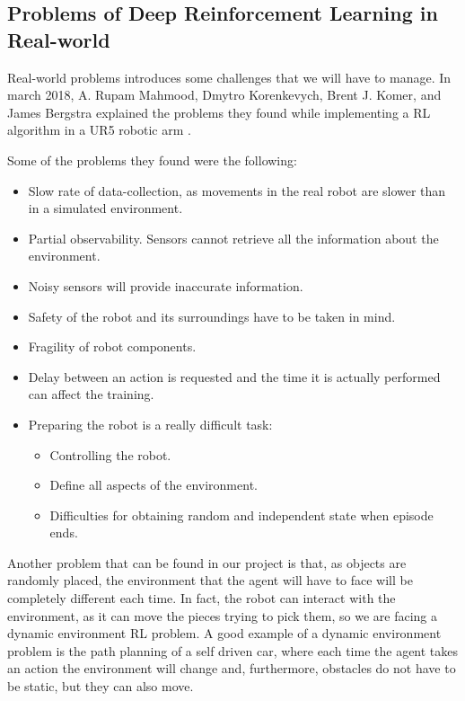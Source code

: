 		
		
		
		
		
	\subsection{Problems of Deep Reinforcement Learning in Real-world}
		
		Real-world problems introduces some challenges that we will have to manage. In march 2018, A. Rupam Mahmood, Dmytro Korenkevych, Brent J. Komer, and James Bergstra explained the problems they found while implementing a RL algorithm in a UR5 robotic arm \cite{mahmood_setting_2018}.
		
		Some of the problems they found were the following:
		
		\begin{itemize}
			\item[\textendash]Slow rate of data-collection, as movements in the real robot are slower than in a simulated environment. 
			\item[\textendash]Partial observability. Sensors cannot retrieve all the information about the environment.
			\item[\textendash]Noisy sensors will provide inaccurate information.
			\item[\textendash]Safety of the robot and its surroundings have to be taken in mind.			
			\item[\textendash]Fragility of robot components.
			\item[\textendash]Delay between an action is requested and the time it is actually performed can affect the training.
			\item[\textendash]Preparing the robot is a really difficult task:			
			\begin{itemize}
				\item[\textendash] Controlling the robot.
				\item[\textendash] Define all aspects of the environment.
				\item[\textendash] Difficulties for obtaining random and independent state when episode ends.
			\end{itemize}
		\end{itemize}
		
		Another problem that can be found in our project is that, as objects are randomly placed, the environment that the agent will have to face will be completely different each time. In fact, the robot can interact with the environment, as it can move the pieces trying to pick them, so we are facing a dynamic environment RL problem. A good example of a dynamic environment problem is the path planning of a self driven car, where each time the agent takes an action the environment will change and, furthermore, obstacles do not have to be static, but they can also move.
		
